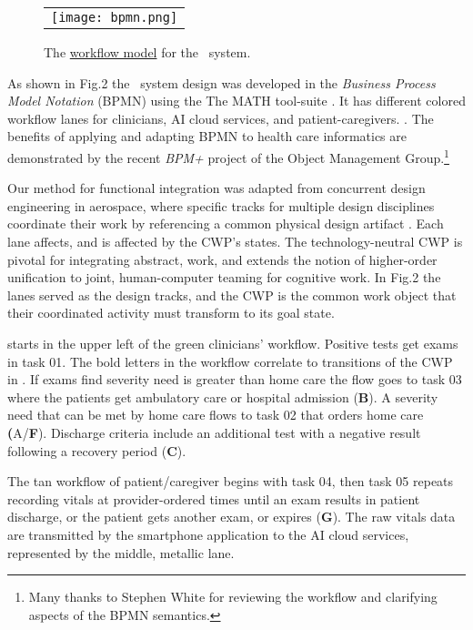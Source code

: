\begin{figure}
  \begin{center}
    \begin{tabular}{c}
      \texttt{[image: bpmn.png]}
    \end{tabular}
  \end{center}
\caption{The \href{https://github.com/ericmercer/SPIN-bpmn-cwp-verification-paper/blob/main/26-Oct-2021-BPMN.png}{workflow model} for the \phware\ system.}
\label{fig:bpmn}
\end{figure}

As shown in Fig.2 the \phware\ system design was developed in the \emph{Business Process Model Notation} (BPMN) \cite{BPMN} using the The MATH tool-suite \cite{workflowmodel}.
It has different colored workflow lanes for clinicians, AI cloud services, and patient-caregivers. .
The benefits of applying and adapting BPMN to health care informatics are demonstrated by the recent \emph{BPM+} project of the Object Management Group.\footnote{Many thanks to Stephen White for reviewing the workflow and clarifying aspects of the BPMN semantics.}

Our method for functional integration was adapted from concurrent design engineering in aerospace, where specific tracks for multiple design disciplines coordinate their work by referencing a common physical design artifact \cite{10.1007/978-1-4471-1538-0_9}.
Each lane affects, and is affected by the CWP's states.
The technology-neutral CWP is pivotal for integrating abstract, work, and extends the notion of higher-order unification \cite{10.1007/3-540-45685-6_2} to joint, human-computer teaming for cognitive work. 
In Fig.2 the lanes served as the design tracks, and the CWP is the common work object that their coordinated activity must transform to its goal state.

 starts in the upper left of the green clinicians' workflow.
Positive tests get exams in task 01. The bold letters in the workflow correlate to transitions of the CWP in .
If exams find severity need is greater than home care the flow goes to task 03 where the patients get ambulatory care or hospital admission (\textbf{B}).
A severity need that can be met by home care flows to task 02 that orders home care \textbf({A}/\textbf{F}).
Discharge criteria include an additional test with a negative result following a recovery period (\textbf{C}).

The tan workflow of patient/caregiver begins with task 04, then task 05 repeats recording vitals at provider-ordered times until an exam results in patient discharge, or the patient gets another exam, or expires (\textbf{G}). 
The raw vitals data are transmitted by the smartphone application to the AI cloud services, represented by the middle, metallic lane. 


